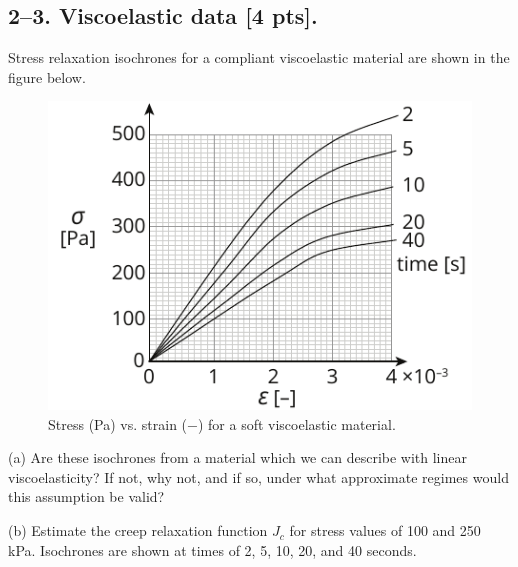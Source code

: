 




\bigskip
\subsection*{2--3. \textbf{Viscoelastic data} [4 pts].} 
Stress relaxation isochrones for a compliant viscoelastic material are shown in the figure below.  

\begin{figure}[H]
\vspace{-1em}
\centering
\includegraphics[scale = 1.5]{instr-figures/PS2-Q3.pdf}
\caption{\small{Stress (Pa) vs. strain ($-$) for a soft viscoelastic material.}}
\end{figure}

\vspace{-1em}
(a) Are these isochrones from a material which we can describe with linear viscoelasticity? If not, why not, and if so, under what approximate regimes would this assumption be valid? 

\medskip
(b) Estimate the creep relaxation function $J_c$ for stress values of 100 and 250 kPa. Isochrones are shown at times of 2, 5, 10, 20, and 40 seconds.   

